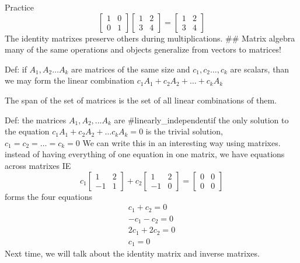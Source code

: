 Practice
$$
\begin{bmatrix}
1 & 0 \\
0 & 1
\end{bmatrix}
\begin{bmatrix}
1 & 2 \\
3 & 4
\end{bmatrix}
=\begin{bmatrix}
1 & 2 \\
3 & 4
\end{bmatrix}
$$
The identity matrixes preserve others during multiplications. 
## Matrix algebra
many of the same operations and objects generalize from vectors to matrices!

Def: if $A_{1},A_{2}\dots A_{k}$ are matrices of the same size and $c_{1},c_{2}\dots,c_{k}$ are scalars, than we may form the linear combination $c_{1}A_{1}+c_{2}A_{2}+\dots+c_{k}A_{k}$ 

The span of the set of matrices is the set of all linear combinations of them.

Def: the matrices $A_{1},A_{2},\dots A_{k}$ are #linearly_independentif the only solution to the equation $c_{1}A_{1}+c_{2}A_{2}+\dots c_{k}A_{k} = 0$ is the trivial solution, $c_{1}=c_{2}=\dots=c_{k}=0$
We can write this in an interesting way using matrixes. instead of having everything of one equation in one matrix, we have equations across matrixes
IE $$
c_{1}\begin{bmatrix}
1 & 2 \\
-1 & 1
\end{bmatrix}+ c_{2}\begin{bmatrix}
1 & 2 \\
-1 & 0
\end{bmatrix} = \begin{bmatrix}
0 & 0 \\
0 & 0
\end{bmatrix}
$$
forms the four equations
$$
\begin{align}
c_{1}+c_{2}=0 \\
-c_{1}-c_{2}=0 \\
2c_{1}+2c_{2}=0 \\
c_{1}=0
\end{align}

$$
Next time, we will talk about the identity matrix and inverse matrixes. 


